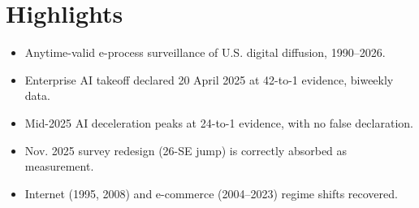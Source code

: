 \documentclass{article}
\begin{document}
\section*{Highlights}
\begin{itemize}
\item Anytime-valid e-process surveillance of U.S. digital diffusion, 1990--2026.
\item Enterprise AI takeoff declared 20 April 2025 at 42-to-1 evidence, biweekly data.
\item Mid-2025 AI deceleration peaks at 24-to-1 evidence, with no false declaration.
\item Nov. 2025 survey redesign (26-SE jump) is correctly absorbed as measurement.
\item Internet (1995, 2008) and e-commerce (2004--2023) regime shifts recovered.
\end{itemize}
\end{document}
